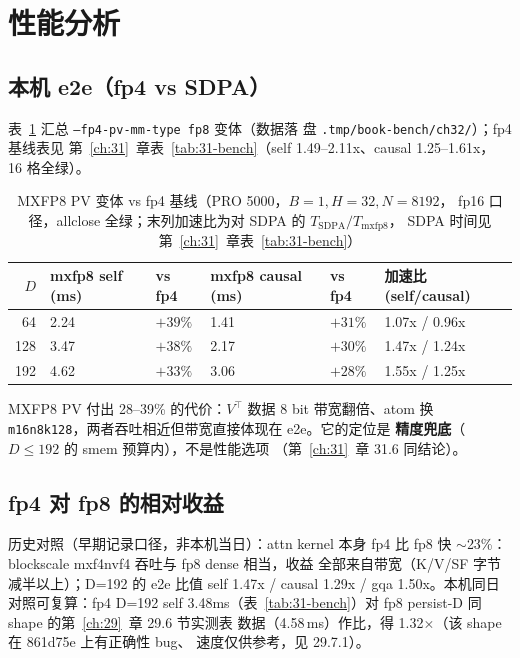 \FloatBarrier

\section{性能分析}

\subsection{本机 e2e（fp4 vs SDPA）}

表~\ref{tab:32-mxfp8} 汇总 \texttt{--fp4-pv-mm-type fp8} 变体（数据落
盘 \texttt{.tmp/book-bench/ch32/}）；fp4 基线表见
第~\ref{ch:31}~章表~\ref{tab:31-bench}（self 1.49--2.11x、causal 1.25--1.61x，
16 格全绿）。

\begin{table}[H]
  \centering
  \caption{MXFP8 PV 变体 vs fp4 基线（PRO 5000，$B{=}1,H{=}32,N{=}8192$，
  fp16 口径，allclose 全绿；末列加速比为对 SDPA 的 $T_{\mathrm{SDPA}}/T_{\mathrm{mxfp8}}$，
  SDPA 时间见第~\ref{ch:31}~章表~\ref{tab:31-bench}）}
  \label{tab:32-mxfp8}
  \begin{tabular}{@{}rlllll@{}}
    \toprule
    $D$ & mxfp8 self (ms) & vs fp4 & mxfp8 causal (ms) & vs fp4 & 加速比
    (self/causal) \\
    \midrule
    64  & 2.24 & $+39\%$ & 1.41 & $+31\%$ & 1.07x / 0.96x \\
    128 & 3.47 & $+38\%$ & 2.17 & $+30\%$ & 1.47x / 1.24x \\
    192 & 4.62 & $+33\%$ & 3.06 & $+28\%$ & 1.55x / 1.25x \\
    \bottomrule
  \end{tabular}
\end{table}

MXFP8 PV 付出 28--39\% 的代价：$V^\top$ 数据 8 bit 带宽翻倍、atom 换
\texttt{m16n8k128}，两者吞吐相近但带宽直接体现在 e2e。它的定位是
\textbf{精度兜底}（$D\le192$ 的 smem 预算内），不是性能选项
（第~\ref{ch:31}~章 31.6 同结论）。

\subsection{fp4 对 fp8 的相对收益}

历史对照（早期记录口径，非本机当日）：attn kernel 本身 fp4 比
fp8 快 $\sim$23\%：blockscale mxf4nvf4 吞吐与 fp8 dense 相当，收益
全部来自带宽（K/V/SF 字节减半以上）；D=192 的 e2e 比值
self 1.47x / causal 1.29x / gqa 1.50x。本机同日对照可复算：fp4 D=192
self 3.48ms（表~\ref{tab:31-bench}）对 fp8 persist-D 同 shape 的第~\ref{ch:29}~章 29.6 节实测表
数据（4.58\,ms）作比，得 1.32$\times$（该 shape 在 861d75e 上有正确性 bug、
速度仅供参考，见 29.7.1）。


